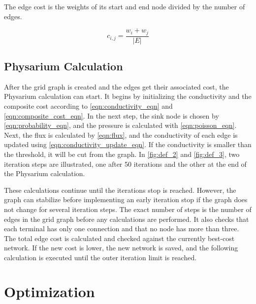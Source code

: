 The edge cost is the weights of its start and end node divided by the number of edges. 

\begin{equation}
    \label{eqn:edge_cost}
    c_{i,j} = \frac{w_i + w_j}{|E|}
\end{equation}

\subsection{Physarium Calculation}
\label{sec:physarium_calculation}
After the grid graph is created and the edges get their associated cost, the Physarium calculation can start. It begins by initializing the conductivity and the composite cost according to \autoref{eqn:conductivity_eqn} and \autoref{eqn:composite_cost_eqn}. 
In the next step, the sink node is chosen by \autoref{eqn:probability_eqn}, and the pressure is calculated with \autoref{eqn:poisson_eqn}. 
Next, the flux is calculated by \autoref{eqn:flux}, and the conductivity of each edge is updated using \autoref{eqn:conductivity_update_eqn}. If the conductivity is smaller than the threshold, it will be cut from the graph. In \autoref{fig:def_2} and \autoref{fig:def_3}, two iteration steps are illustrated, one after 50 iterations and the other at the end of the Physarium calculation.

These calculations continue until the iterations stop is reached. However, the graph can stabilize before implementing an early iteration stop if the graph does not change for several iteration steps. The exact number of steps is the number of edges in the grid graph before any calculations are performed. It also checks that each terminal has only one connection and that no node has more than three. The total edge cost is calculated and checked against the currently best-cost network. If the new cost is lower, the new network is saved, and the following calculation is executed until the outer iteration limit is reached. 

\section{Optimization}
\label{sec:optimization}

